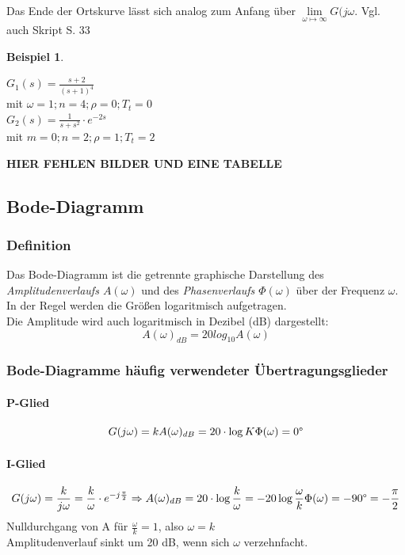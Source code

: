 \message{ !name(Mitschrieb_SysRegel.tex)}\documentclass[12pt,a4paper,ngerman]{scrartcl}
\newtheorem{bsp}{Beispiel}[section] %
\begin{document}
Das Ende der Ortskurve lässt sich analog zum Anfang über $\lim\limits_{\omega \mapsto \infty}{G(j\omega}$. Vgl. auch Skript S. 33
\begin{bsp}
\end{bsp}
$G_1(s)=\frac{s+2}{(s+1)^4}$ \\
mit $\omega =1;n=4;\rho=0;T_t=0$\\
$G_2(s)=\frac{1}{s+s^2}\cdot e^{-2s}$\\
mit $m=0;n=2;\rho=1;T_t=2$

\textbf{HIER FEHLEN BILDER UND EINE TABELLE}
\subsection{Bode-Diagramm}

\subsubsection{Definition}

Das Bode-Diagramm ist die getrennte graphische Darstellung des \emph{Amplitudenverlaufs $A(\omega)$} und des \emph{Phasenverlaufs $\Phi(\omega)$} über der Frequenz $\omega$. In der Regel werden die Größen logaritmisch aufgetragen.\\
Die Amplitude wird auch logaritmisch in Dezibel (dB) dargestellt:
\[
A(\omega)_{dB}=20 log_{10}A(\omega)
\]

\subsubsection{Bode-Diagramme häufig verwendeter Übertragungsglieder}

\paragraph{P-Glied}

\[
G(j\omega)=k\\
A(\omega)_{dB}=20\cdot \log{K}\\
\Phi(\omega)=0\degree
\]

\paragraph{I-Glied}

\[
G(j\omega)=\frac{k}{j\omega}=\frac{k}{\omega}\cdot e^{-j\frac{\pi}{2}}\\
\Rightarrow A(\omega)_{dB}=20\cdot \log{\frac{k}{\omega}}=-20 \log{\frac{\omega}{k}}\\
\Phi(\omega)=-90\degree=-\frac{\pi}{2}
\]
Nulldurchgang von A für $\frac{\omega}{k}=1$, also $\omega =k$\\
Amplitudenverlauf sinkt um 20 dB, wenn sich $\omega$  verzehnfacht.
\end{document}
